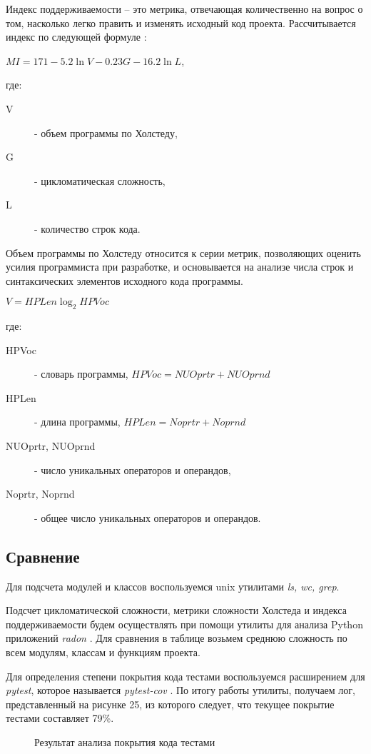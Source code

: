     Индекс поддерживаемости -- это метрика, отвечающая количественно на вопрос
    о том, насколько легко править и изменять исходный код проекта.
    Рассчитывается индекс по следующей формуле \cite{metrics.cmcons}:
    \begin{center}
        $ MI = 171 - 5.2 \ln V - 0.23G - 16.2 \ln L $,
    \end{center}
    где:
    \begin{description}
        \item [V] - объем программы по Холстеду,
        \item [G] - цикломатическая сложность,
        \item [L] - количество строк кода.
    \end{description}

    Объем программы по Холстеду относится к серии метрик, позволяющих оценить
    усилия программиста при разработке, и основывается на анализе числа строк
    и синтаксических элементов исходного кода программы.
    \begin{center}
        $ V = HPLen \log_{2}HPVoc $
    \end{center}
    где:
    \begin{description}
        \item [HPVoc] - словарь программы,
        $ HPVoc = NUOprtr + NUOprnd $
        \item [HPLen] - длина программы,
        $ HPLen = Noprtr + Noprnd $
        \item [NUOprtr, NUOprnd] - число уникальных операторов и операндов,
        \item [Noprtr, Noprnd] - общее число уникальных операторов и операндов.
    \end{description}

    \subsection{Сравнение}
    Для подсчета модулей и классов воспользуемся unix утилитами \textit{ls, wc, grep}.

    Подсчет цикломатической сложности, метрики сложности Холстеда и индекса
    поддерживаемости будем осуществлять при помощи утилиты для
    анализа Python приложений \textit{radon} \cite{complexity.radon}.
    Для сравнения в таблице возьмем среднюю сложность по всем модулям, классам
    и функциям проекта.
    
    Для определения степени покрытия кода тестами воспользуемся расширением для
    \textit{pytest}, которое называется \textit{pytest-cov}
    \cite{test.pytest.cov}.
    По итогу работы утилиты, получаем лог, представленный на рисунке 25,
    из которого следует, что текущее покрытие тестами составляет 79\%.
    \begin{figure}[H]
        \centering
        
        \caption{Результат анализа покрытия кода тестами}
        \label{fig:pytest-coverage}
    \end{figure}
    \newpage

